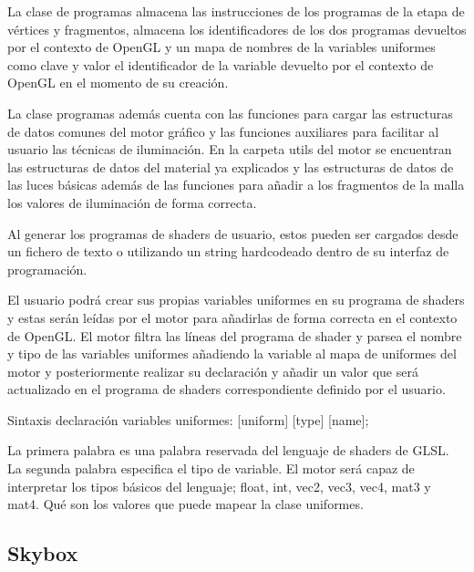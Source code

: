 \documentclass[a4paper, 17pt]{book}
\begin{document}
\vspace{1mm} %

La clase de programas almacena las instrucciones de los programas de la etapa de vértices y fragmentos, almacena los identificadores
de los dos programas devueltos por el contexto de OpenGL y un mapa de nombres de la variables uniformes como clave y valor el
identificador de la variable devuelto por el contexto de OpenGL en el momento de su creación.

\vspace{1mm} %

La clase programas además cuenta con las funciones para cargar las estructuras de datos comunes del motor gráfico y las funciones
auxiliares para facilitar al usuario las técnicas de iluminación. En la carpeta utils del motor se encuentran las estructuras de
datos del material ya explicados y las estructuras de datos de las luces básicas además de las funciones para añadir a los fragmentos
de la malla los valores de iluminación de forma correcta.

\vspace{1mm} %

Al generar los programas de shaders de usuario, estos pueden ser cargados desde un fichero de texto o utilizando un string hardcodeado
dentro de su interfaz de programación.

\vspace{1mm} %

El usuario podrá crear sus propias variables uniformes en su programa de shaders y estas serán leídas por el motor para añadirlas de
forma correcta en el contexto de OpenGL. El motor filtra las líneas del programa de shader y parsea el nombre y tipo de las variables
uniformes añadiendo la variable al mapa de uniformes del motor y posteriormente realizar su declaración y añadir un valor que será
actualizado en el programa de shaders correspondiente definido por el usuario.

{\Large Sintaxis declaración variables uniformes:  [uniform]    [type]    [name];\par}

La primera palabra es una palabra reservada del lenguaje de shaders de GLSL. La segunda palabra especifica el tipo de variable. El motor
será capaz de interpretar los tipos básicos del lenguaje; float, int, vec2, vec3, vec4, mat3 y mat4. Qué son los valores que puede mapear
la clase uniformes. 

\subsection{Skybox}
\label{subsec:Skybox}
\end{document}

